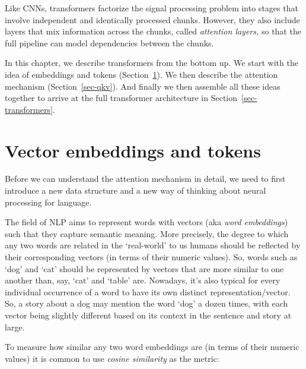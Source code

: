 Like CNNs, transformers factorize the signal processing problem into stages that involve independent and identically processed chunks. However, they also include layers that mix information across the chunks, called {\em attention layers,} so that the full pipeline can model dependencies between the chunks.

In this chapter, we describe transformers from the bottom up. We start with the idea of embeddings and tokens (Section~\ref{sec-embeddings}). We then describe the attention mechanism (Section~\ref{sec-qkv}). And finally we then assemble all these ideas together to arrive at the full transformer architecture in Section~\ref{sec-transformers}.

\section{Vector embeddings and tokens}
\label{sec-embeddings}


Before we can understand the attention mechanism in detail, we need to first introduce a new data structure and a new way of thinking about neural processing for language.

The field of NLP aims to represent words with vectors (aka {\em word embeddings}) such that they capture semantic meaning. More precisely, the degree to which any two words are related in the `real-world' to us humans should be reflected by their corresponding vectors (in terms of their numeric values). So, words such as `dog' and `cat' should be represented by vectors that are more similar to one another than, say, `cat' and `table' are. Nowadays, it's also typical for every individual occurrence of a word to have its own distinct representation/vector. So, a story about a dog may mention the word `dog' a dozen times, with each vector being slightly different based on its context in the sentence and story at large.

To measure how similar any two word embeddings are (in terms of their numeric values) it is common to use {\em cosine similarity} as the metric:


